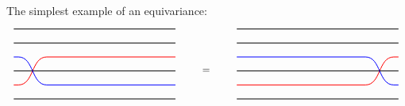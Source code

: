 The simplest example of an equivariance:
\begin{equation}
\begin{tikzpicture}[every path/.style={thick}]
\node[] (x0) at (-3, 0) {};
\node[] (x1) at (-3, 0.5) {};
\node[] (1i) at (-2.7, 0.5) {};
\node[] (1j) at (-1.7, 0.5) {};
\node[] (x2) at (-3, 1) {};
\node[] (x3) at (-3, 1.5) {};
\node[] (3i) at (-2.7, 1.5) {};
\node[] (3j) at (-1.7, 1.5) {};
\node[] (x4) at (-3, 2) {};
\node[] (x5) at (-3, 2.5) {};
\node[] (y0) at (3, 0) {};
\node[] (y1) at (3, 0.5) {};
\node[] (y2) at (3, 1) {};
\node[] (y3) at (3, 1.5) {};
\node[] (y4) at (3, 2) {};
\node[] (y5) at (3, 2.5) {};
\draw (x0) to (y0);
\draw[red] (x1) to (1i.center);
    \draw[red] (1i.center) to[out=0,in=-180] (3j.center);
    \draw[red] (3j.center) to (y3);
\draw (x2) to (y2);
\draw[blue] (x3) to (3i.center);
    \draw[blue] (3i.center) to[out=0,in=-180] (1j.center);
    \draw[blue] (1j.center) to (y1);
\draw (x4) to (y4);
\draw (x5) to (y5);
\end{tikzpicture}
\qquad \raisebox{3em}{=} \qquad
\begin{tikzpicture}[every path/.style={thick}]
\node[] (x0) at (-3, 0) {};
\node[] (x1) at (-3, 0.5) {};
\node[] (1i) at (1.7, 0.5) {};
\node[] (1j) at (2.7, 0.5) {};
\node[] (x2) at (-3, 1) {};
\node[] (x3) at (-3, 1.5) {};
\node[] (3i) at (1.7, 1.5) {};
\node[] (3j) at (2.7, 1.5) {};
\node[] (x4) at (-3, 2) {};
\node[] (x5) at (-3, 2.5) {};
\node[] (y0) at (3, 0) {};
\node[] (y1) at (3, 0.5) {};
\node[] (y2) at (3, 1) {};
\node[] (y3) at (3, 1.5) {};
\node[] (y4) at (3, 2) {};
\node[] (y5) at (3, 2.5) {};
\draw (x0) to (y0);
\draw[red] (x1) to (1i.center);
	\draw[red] (1i.center) to[out=0,in=-180] (3j.center);
	\draw[red] (3j.center) to (y3);
\draw (x2) to (y2);
\draw[blue] (x3) to (3i.center);
	\draw[blue] (3i.center) to[out=0,in=-180] (1j.center);
	\draw[blue] (1j.center) to (y1);
\draw (x4) to (y4);
\draw (x5) to (y5);
\end{tikzpicture}
\end{equation}

